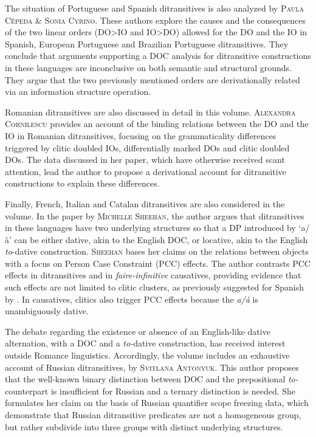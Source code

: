 \documentclass[output=paper,modfonts,nonflat,colorlinks,citecolor=brown]{langsci/langscibook}
\begin{document}
The situation of Portuguese and Spanish ditransitives is also analyzed by {\textsc{Paula Cépeda \& Sonia Cyrino}}. These authors explore the causes and the consequences of the two linear orders (DO>IO and IO>DO) allowed for the DO and the IO in Spanish, European Portuguese and Brazilian Portuguese ditransitives. They conclude that arguments supporting a DOC analysis for ditransitive constructions in these languages are inconclusive on both semantic and structural grounds. They argue that the two previously mentioned orders are derivationally related via an information structure operation.



Romanian ditransitives are also discussed in detail in this volume. {\textsc{Alexandra Cornilescu}} provides an account of the binding relations between the DO and the IO in Romanian ditransitives, focusing on the grammaticality differences triggered by clitic doubled IOs, differentially marked DOs and clitic doubled DOs. The data discussed in her paper, which have otherwise received scant attention, lead the author to propose a derivational account for ditransitive constructions to explain these differences.



Finally, French, Italian and Catalan ditransitives are also considered in the volume. In the paper by {\textsc{Michelle Sheehan,}} the author argues that ditransitives in these languages have two underlying structures so that a DP introduced by ‘a/à’ can be either dative, akin to the English DOC, or locative, akin to the English {\textit{to}}{}-dative construction. {\textsc{Sheehan}} bases her claims on the relations between objects with a focus on Person Case Constraint (PCC) effects. The author contrasts PCC effects in ditransitives and in {\textit{faire-infinitive}} causatives, providing evidence that such effects are not limited to clitic clusters, as previously suggested for Spanish by \citet{OrmazabalRomero2013}. In causatives, clitics also trigger PCC effects because the {\textit{a/à}} is unambiguously dative.



The debate regarding the existence or absence of an English-like dative alternation, with a DOC and a {\textit{to-}}dative construction, has received interest outside Romance linguistics. Accordingly, the volume includes an exhaustive account of Russian ditransitives, by \textsc{Svitlana} {\textsc{Antonyuk.}} This author proposes that the well-known binary distinction between DOC and the prepositional {\textit{to-}}counterpart is insufficient for Russian and a ternary distinction is needed. She formulates her claim on the basis of Russian quantifier scope freezing data, which demonstrate that Russian ditransitive predicates are not a homogeneous group, but rather subdivide into three groups with distinct underlying structures.
\end{document}
